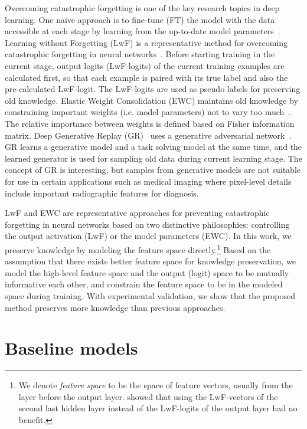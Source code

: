 \documentclass[runningheads,a4paper]{llncs}
\begin{document}
Overcoming catastrophic forgetting is one of the key research topics in deep learning. One naive approach is to fine-tune (FT) the model with the data accessible at each stage by learning from the up-to-date model parameters~\cite{r09_ft_cvpr2014}. Learning without Forgetting (LwF) is a representative method for overcoming catastrophic forgetting in neural networks~\cite{r10_lwf_eccv2016}. Before starting training in the current stage, output logits (LwF-logits) of the current training examples are calculated first, so that each example is paired with its true label and also the pre-calculated LwF-logit. The LwF-logits are used as pseudo labels for preserving old knowledge. Elastic Weight Consolidation (EWC) maintains old knowledge by constraining important weights (i.e. model parameters) not to vary too much~\cite{r11_ewc_nas2017}. The relative importance between weights is defined based on Fisher information matrix. Deep Generative Replay (GR)~\cite{r12_gr_arxiv2017} uses a generative adversarial network~\cite{r18_gan_nips2014}. GR learns a generative model and a task solving model at the same time, and the learned generator is used for sampling old data during current learning stage. The concept of GR is interesting, but samples from generative models are not suitable for use in certain applications such as medical imaging where pixel-level details include important radiographic features for diagnosis.

LwF and EWC are representative approaches for preventing catastrophic forgetting in neural networks based on two distinctive philosophies: controlling the output activation (LwF) or the model parameters (EWC). In this work, we preserve knowledge by modeling the feature space directly.\footnote{We denote \textit{feature space} to be the space of feature vectors, usually from the layer before the output layer. \cite{r10_lwf_eccv2016} showed that using the LwF-vectors of the second last hidden layer instead of the LwF-logits of the output layer had no benefit.} Based on the assumption that there exists better feature space for knowledge preservation, we model the high-level feature space and the output (logit) space to be mutually informative each other, and constrain the feature space to be in the modeled space during training. With experimental validation, we show that the proposed method preserves more knowledge than previous approaches.


\section{Baseline models}
\end{document}
